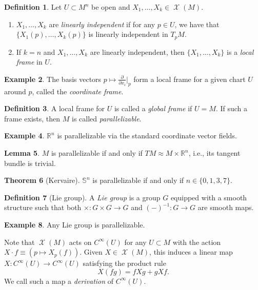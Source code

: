 \documentclass[10pt,letterpaper,cm]{nupset}
\theoremstyle{definition}
\newtheorem{definition}{Definition}[subsection]
\newtheorem{exmp}[definition]{Example}
\theoremstyle{theorem}
\newtheorem{theorem}[definition]{Theorem}
\newtheorem{lemma}[definition]{Lemma}
\theoremstyle{remark}
\newcommand{\R}{\mathbb R}
\renewcommand{\S}{\mathbb S}
\newcommand{\1}{\mathbf{1}}
\newcommand{\0}{\vec 0}
\DeclareMathOperator{\vf}{\mathscr{X}}
\begin{document}
\begin{definition} Let $U \subset M^n$ be open and $X_1, \ldots, X_k \in \vf(M)$. 
\begin{enumerate}
\item  $X_1, \ldots, X_k$ are \textit{linearly independent} if for any $p\in U$, we have that $\{X_1(p), \ldots, X_k(p)\}$ is linearly independent in $T_pM$.
\item If $k=n$ and $X_1, \ldots, X_k$ are linearly independent, then $\{X_1, \ldots, X_k\}$ is a \textit{local frame} in $U$.
\end{enumerate}
\end{definition}

\begin{exmp}
The basis vectors $p\mapsto \frac{\partial}{\partial{x_i}}\bigr\rvert_p$ form a local frame for a given chart $U$ around $p$, called the \textit{coordinate frame}.
\end{exmp}

\begin{definition}
A  local frame for $U$ is called a \textit{global frame} if $U =M$. If such a frame exists, then $M$ is called \textit{parallelizable}.
\end{definition}

\begin{exmp}
$\R^n$ is parallelizable via the standard coordinate vector fields.
\end{exmp}

\begin{lemma}
$M$ is parallelizable if and only if $TM \approx M \times \R^n$, i.e., its tangent bundle is trivial.
\end{lemma}

\begin{theorem}[Kervaire]
$\S^n$ is parallelizable if and only if $n\in \{0, 1, 3, 7\}$.
\end{theorem}

\begin{definition}[Lie group]
A  \textit{Lie group} is a group $G$ equipped with a smooth structure such that both $\times : G \times G \to G$ and $({-})^{-1} : G \to G$ are smooth maps.
\end{definition}

\begin{exmp}
Any Lie group is parallelizable. 
\end{exmp}

\medskip

Note that $\vf(M)$ acts on $C^{\infty}(U)$ for any $U \subset M$ with the action $X \cdot f \equiv \left(p \mapsto X_p(f)\right)$. Given $X \in \vf(M)$, this induces a linear map $X : C^{\infty}(U) \to C^{\infty}(U)$ satisfying the product rule $$X(fg) = fXg  + gXf.$$ We call such a map a \textit{derivation} of $C^{\infty}(U)$.
\end{document}
